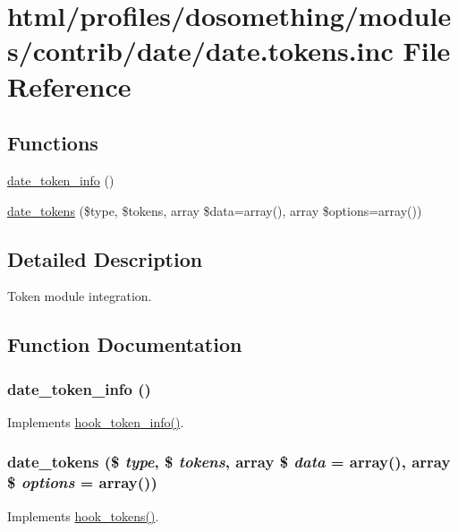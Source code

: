 \hypertarget{date_8tokens_8inc}{
\section{html/profiles/dosomething/modules/contrib/date/date.tokens.inc File Reference}
\label{date_8tokens_8inc}
}
\subsection*{Functions}
\begin{DoxyCompactItemize}
\item 
\hyperlink{date_8tokens_8inc_a6af146f73a63f5519e65c0c4936e9c58}{date\_\-token\_\-info} ()
\item 
\hyperlink{date_8tokens_8inc_a0326bcb262a776cbceb8c7dbcad08f2e}{date\_\-tokens} (\$type, \$tokens, array \$data=array(), array \$options=array())
\end{DoxyCompactItemize}


\subsection{Detailed Description}
Token module integration. 

\subsection{Function Documentation}
\hypertarget{date_8tokens_8inc_a6af146f73a63f5519e65c0c4936e9c58}{
\subsubsection[{date\_\-token\_\-info}]{\setlength{\rightskip}{0pt plus 5cm}date\_\-token\_\-info ()}}
\label{date_8tokens_8inc_a6af146f73a63f5519e65c0c4936e9c58}
Implements \hyperlink{group__hooks_gab868597197cf36911f95dcd29ae0b954}{hook\_\-token\_\-info()}. \hypertarget{date_8tokens_8inc_a0326bcb262a776cbceb8c7dbcad08f2e}{
\subsubsection[{date\_\-tokens}]{\setlength{\rightskip}{0pt plus 5cm}date\_\-tokens (\$ {\em type}, \/  \$ {\em tokens}, \/  array \$ {\em data} = {\ttfamily array()}, \/  array \$ {\em options} = {\ttfamily array()})}}
\label{date_8tokens_8inc_a0326bcb262a776cbceb8c7dbcad08f2e}
Implements \hyperlink{group__hooks_ga3bfd87d9a19b2397b0f970e1cff7ea4f}{hook\_\-tokens()}. 